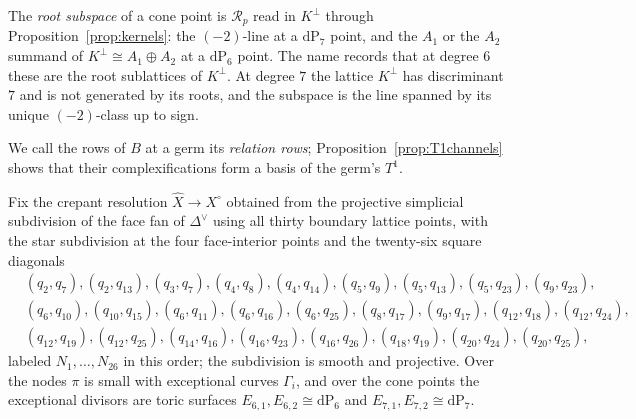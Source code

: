\documentclass[11pt]{amsart}
\theoremstyle{definition}
\theoremstyle{remark}
\theoremstyle{plain}
\newcommand{\Rsm}{\mathcal{R}}   %
\newcommand{\dP}{\mathrm{dP}}
\newcommand{\Xh}{\widehat{X}}
\begin{document}
The \emph{root subspace} of a cone point is $\Rsm_p$ read in $K^{\perp}$ through
Proposition~\ref{prop:kernels}: the $(-2)$-line at a $\dP_7$ point, and the
$A_1$ or the $A_2$ summand of $K^{\perp}\cong A_1\oplus A_2$ at a $\dP_6$ point.
The name records that at degree $6$ these are the root sublattices of
$K^{\perp}$.  At degree $7$ the lattice $K^{\perp}$ has discriminant $7$ and is
not generated by its roots, and the subspace is the line spanned by its unique
$(-2)$-class up to sign.

We call the rows of $B$ at a germ its \emph{relation rows};
Proposition~\ref{prop:T1channels} shows that their complexifications form a
basis of the germ's $T^1$.

Fix the crepant resolution $\Xh\to X^{\circ}$ obtained from the
projective simplicial subdivision of the face fan of $\Delta^\vee$
using all thirty boundary lattice points, with the star subdivision at
the four face-interior points and the twenty-six square diagonals
\[
\begin{aligned}
&(q_2,q_7),(q_2,q_{13}),(q_3,q_7),(q_4,q_8),(q_4,q_{14}),
(q_5,q_9),(q_5,q_{13}),(q_5,q_{23}),(q_9,q_{23}),\\
&(q_6,q_{10}),(q_{10},q_{15}),(q_6,q_{11}),(q_6,q_{16}),
(q_6,q_{25}),(q_8,q_{17}),(q_9,q_{17}),(q_{12},q_{18}),
(q_{12},q_{24}),\\
&(q_{12},q_{19}),(q_{12},q_{25}),(q_{14},q_{16}),(q_{16},q_{23}),
(q_{16},q_{26}),(q_{18},q_{19}),(q_{20},q_{24}),(q_{20},q_{25}),
\end{aligned}
\]
labeled $N_1,\dots,N_{26}$ in this order; the subdivision is smooth
and projective.  Over the nodes $\pi$ is small with
exceptional curves $\Gamma_i$, and over the cone points the
exceptional divisors are toric surfaces
$E_{6,1},E_{6,2}\cong\dP_6$ and $E_{7,1},E_{7,2}\cong\dP_7$.
\end{document}

